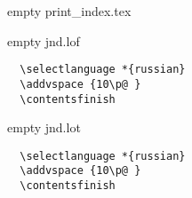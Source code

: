  
 
 
 
 

empty print_index.tex

empty jnd.lof

\begin{verbatim}
  \selectlanguage *{russian}
  \addvspace {10\p@ }
  \contentsfinish
\end{verbatim}

empty jnd.lot

\begin{verbatim}
  \selectlanguage *{russian}
  \addvspace {10\p@ }
  \contentsfinish
\end{verbatim}
